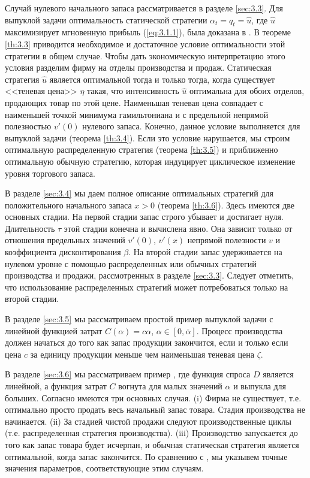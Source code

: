 Случай нулевого начального запаса рассматривается в разделе \ref{sec:3.3}. Для выпуклой задачи оптимальность статической стратегии  $\alpha_t=q_t=\widehat u$, где $\widehat u$ максимизирует мгновенную прибыль (\ref{eq:3.1.1}), была доказана в \cite{ChaJouTah03}. В теореме \ref{th:3.3} приводится необходимое и достаточное условие оптимальности этой стратегии в общем случае. Чтобы дать экономическую интерпретацию этого условия разделим фирму на отделы производства и продаж. Статическая стратегия $\widehat u$ является оптимальной тогда и только тогда, когда существует <<теневая цена>> $\eta$ такая, что
интенсивность $\widehat u$ оптимальна для обоих отделов, продающих товар по этой цене. Наименьшая теневая цена совпадает с наименьшей точкой минимума гамильтониана и с предельной непрямой полезностью $v'(0)$ нулевого запаса. Конечно, данное условие выполняется для выпуклой задачи (теорема \ref{th:3.4}). Если это условие нарушается, мы строим оптимальную распределенную стратегия (теорема \ref{th:3.5}) и приближенно оптимальную обычную стратегию, которая индуцирует циклическое изменение уровня торгового запаса.

В разделе \ref{sec:3.4} мы даем полное описание оптимальных стратегий для положительного начального запаса $x>0$ (теорема \ref{th:3.6}). Здесь имеются две основных стадии. На первой стадии запас строго убывает и достигает нуля. Длительность  $\tau$ этой стадии конечна и вычислена явно. Она зависит только от отношения предельных значений $v'(0)$, $v'(x)$ непрямой полезности $v$ и коэффициента дисконтирования $\beta$. На второй стадии запас удерживается на нулевом уровне с помощью распределенных или обычных стратегий производства и продажи, рассмотренных в разделе \ref{sec:3.3}. Следует отметить, что использование распределенных стратегий может потребоваться только на второй стадии.

В разделе \ref{sec:3.5} мы рассматриваем простой пример выпуклой задачи с линейной функцией затрат $C(\alpha)=c\alpha$, $\alpha\in [0,\overline\alpha]$. Процесс производства должен начаться до того как запас продукции закончится, если и только если цена $c$ за единицу продукции меньше чем наименьшая теневая цена $\zeta$.

В разделе \ref{sec:3.6} мы рассматриваем пример \cite{ArvMos81}, где функция спроса $D$ является линейной, а функция затрат $C$ вогнута для малых значений $\alpha$ и выпукла для больших. Согласно \cite{ArvMos81,ArvMos82} имеются три основных случая. (i) Фирма не существует, т.е. оптимально просто продать весь начальный запас товара. Стадия производства не начинается. (ii) За стадией чистой продажи следуют производственные циклы (т.е. распределенная стратегия производства). (iii) Производство запускается до того как запас товара будет исчерпан, и обычная статическая стратегия является оптимальной, когда запас закончится. По сравнению с \cite{ArvMos81}, мы указывем точные значения параметров, соответствующие этим случаям.

